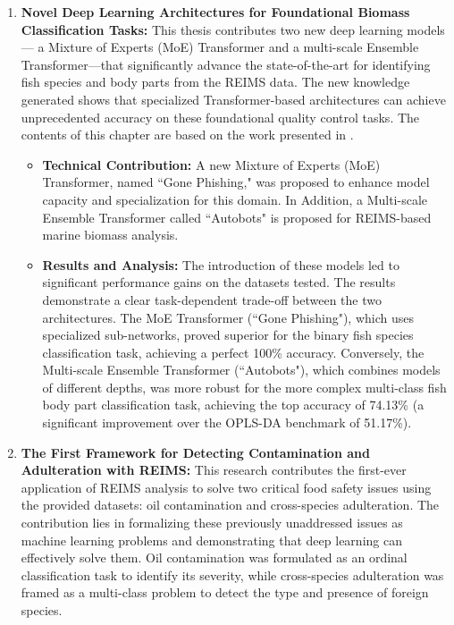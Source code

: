 \begin{enumerate}
\item \textbf{Novel Deep Learning Architectures for Foundational Biomass Classification Tasks:} This thesis contributes two new deep learning models --- a Mixture of Experts (MoE) Transformer and a multi-scale Ensemble Transformer---that significantly advance the state-of-the-art for identifying fish species and body parts from the REIMS data. The new knowledge generated shows that specialized Transformer-based architectures can achieve unprecedented accuracy on these foundational quality control tasks.
The contents of this chapter are based on the work presented in \citep{Wood2025a}.
\begin{itemize}
\item \textbf{Technical Contribution:}
A new Mixture of Experts (MoE) Transformer, named ``Gone Phishing," was proposed to enhance model capacity and specialization for this domain. In Addition, a Multi-scale Ensemble Transformer called ``Autobots" is proposed for REIMS-based marine biomass analysis.
\item \textbf{Results and Analysis:}
The introduction of these models led to significant performance gains on the datasets tested. The results demonstrate a clear task-dependent trade-off between the two architectures. The MoE Transformer (``Gone Phishing"), which uses specialized sub-networks, proved superior for the binary fish species classification task, achieving a perfect 100\% accuracy. Conversely, the Multi-scale Ensemble Transformer (``Autobots"), which combines models of different depths, was more robust for the more complex multi-class fish body part classification task, achieving the top accuracy of 74.13\% (a significant improvement over the OPLS-DA benchmark of 51.17\%). 
\end{itemize}
\item \textbf{The First Framework for Detecting Contamination and Adulteration with REIMS:}
This research contributes the first-ever application of REIMS analysis to solve two critical food safety issues using the provided datasets: oil contamination and cross-species adulteration. The contribution lies in formalizing these previously unaddressed issues as machine learning problems and demonstrating that deep learning can effectively solve them.
Oil contamination was formulated as an ordinal classification task to identify its severity, while cross-species adulteration was framed as a multi-class problem to detect the type and presence of foreign species.
\begin{itemize}

\end{itemize}
\end{enumerate}

